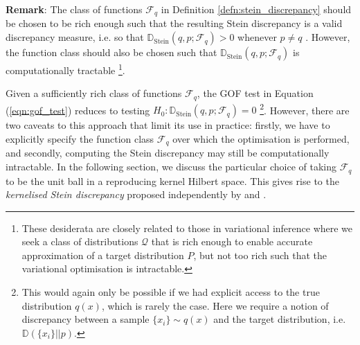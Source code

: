 
\textbf{Remark}: The class of functions $\mathcal{F}_q$ in Definition \ref{defn:stein_discrepancy} should be chosen to be rich enough such that the resulting Stein discrepancy is a valid discrepancy measure, i.e. so that $\mathbb{D}_{\text{Stein}}(q, p; \mathcal{F}_q) > 0$ whenever $p \not=q$ \citep{liu_ksd}. However, the function class should also be chosen such that $\mathbb{D}_{\mathrm{Stein}}(q, p; \mathcal{F}_q)$ is computationally tractable \footnote{These desiderata are closely related to those in variational inference where we seek a class of distributions $\mathcal{Q}$ that is rich enough to enable accurate approximation of a target distribution $P$, but not too rich such that the variational optimisation is intractable.}.

Given a sufficiently rich class of functions $\mathcal{F}_q$, the GOF test in Equation (\ref{eqn:gof_test}) reduces to testing $H_0: \mathbb{D}_{\mathrm{Stein}}(q, p; \mathcal{F}_q) = 0$ \footnote{This would again only be possible if we had explicit access to the true distribution $q(x)$, which is rarely the case. Here we require a notion of discrepancy between a sample $\{x_i\} \sim q(x)$ and the target distribution, i.e. $\mathbb{D}(\{x_i\}||p)$.}. However, there are two caveats to this approach that limit its use in practice: firstly, we have to explicitly specify the function class $\mathcal{F}_q$ over which the optimisation is performed, and secondly, computing the Stein discrepancy may still be computationally intractable. In the following section, we discuss the particular choice of taking $\mathcal{F}_q$ to be the unit ball in a reproducing kernel Hilbert space. This gives rise to the \textit{kernelised Stein discrepancy} proposed independently by \citet{liu_ksd} and \citet{chwialkowski_ksd}.


